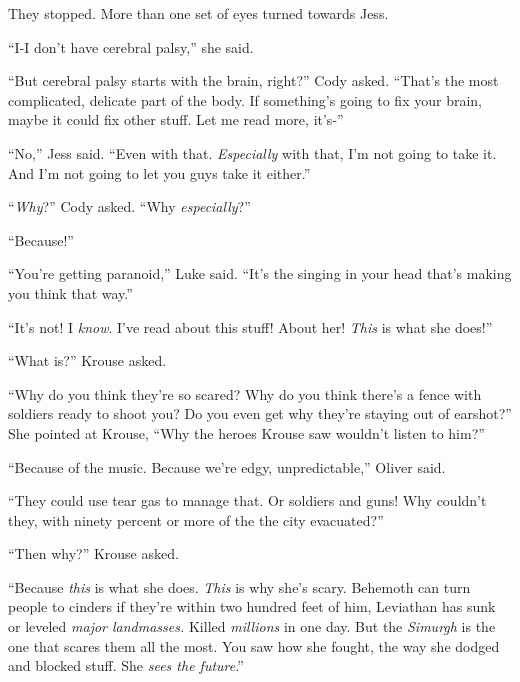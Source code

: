 They stopped.  More than one set of eyes turned towards Jess.



``I-I don't have cerebral palsy,'' she said.



``But cerebral palsy starts with the brain, right?'' Cody asked.  ``That's the most complicated, delicate part of the body.  If something's going to fix your brain, maybe it could fix other stuff.  Let me read more, it's-''



``No,'' Jess said.  ``Even with that.  \emph{Especially} with that, I'm not going to take it.  And I'm not going to let you guys take it either.''



``\emph{Why}?'' Cody asked.  ``Why \emph{especially}?''



``Because!''



``You're getting paranoid,'' Luke said.  ``It's the singing in your head that's making you think that way.''



``It's not!  I \emph{know}.  I've read about this stuff!  About her!  \emph{This} is what she does!''



``What is?'' Krouse asked.



``Why do you think they're so scared?  Why do you think there's a fence with soldiers ready to shoot you?  Do you even get why they're staying out of earshot?''  She pointed at Krouse, ``Why the heroes Krouse saw wouldn't listen to him?''



``Because of the music.  Because we're edgy, unpredictable,'' Oliver said.



``They could use tear gas to manage that.  Or soldiers and guns!  Why couldn't they, with ninety percent or more of the the city evacuated?''



``Then why?'' Krouse asked.



``Because \emph{this} is what she does.  \emph{This} is why she's scary.  Behemoth can turn people to cinders if they're within two hundred feet of him, Leviathan has sunk or leveled \emph{major landmasses.  }Killed\emph{ millions }in one day.  But the \emph{Simurgh }is the one that scares them all the most.  You saw how she fought, the way she dodged and blocked stuff.  She \emph{sees the future}.''



